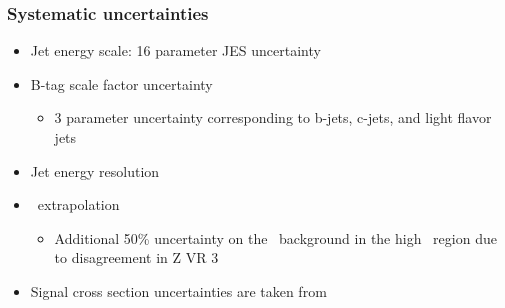 \documentclass[10pt, svgnames]{beamer}
\begin{document}
\begin{frame}
  \frametitle{Systematic uncertainties}
  \begin{itemize}
    \item Jet energy scale: 16 parameter JES uncertainty
    \item B-tag scale factor uncertainty
      \begin{itemize}
        \item 3 parameter uncertainty corresponding
          to b-jets, c-jets, and light flavor jets
      \end{itemize}
    \item Jet energy resolution
    \item \HT\ extrapolation
      \begin{itemize}
        \item 
          Additional 50\% uncertainty on the \ZGAMMA\ background
          in the high \HT\ region due to disagreement in Z VR 3
      \end{itemize}
    \item Signal cross section uncertainties are taken from
  \end{itemize}
\end{frame}
\end{document}
